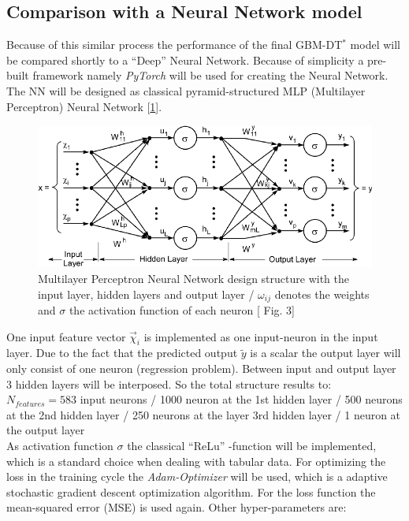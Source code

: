 \documentclass[12pt, a4paper]{article}
\begin{document}
\subsection{Comparison with a Neural Network model}
Because of this similar process the performance of the final GBM-DT$^{\ast}$ model will be compared shortly to a ``Deep'' Neural Network. Because of simplicity a pre-built framework namely \textit{PyTorch} \cite{PytorchNN} will be used for creating the Neural Network. The NN will be designed as classical pyramid-structured MLP (Multilayer Perceptron) Neural Network [\ref{fig: nn_mlp}].
\begin{figure}[!htpb]
    \centering
    \includegraphics[width=1\textwidth,trim={0 0 0 0},clip]{figures/The-structure-of-a-multilayer-perceptron-neural-network.png}
    \caption[Multilayer Perceptron Neural Network design structure]{Multilayer Perceptron Neural Network design structure with the input layer, hidden layers and output layer / $\omega_{ij}$ denotes the weights and $\sigma$ the activation function of each neuron [\cite{Faghfouri2011} Fig. 3]}
    \label{fig: nn_mlp}
\end{figure}
One input feature vector $\vec{\chi}_i$ is implemented as one input-neuron in the input layer. Due to the fact that the predicted output $\tilde{y}$ is a scalar the output layer will only consist of one neuron (regression problem). Between input and output layer 3 hidden layers will be interposed. So the total structure results to: $N_{features} = 583$ input neurons / 1000 neuron at the 1st hidden layer / 500 neurons at the 2nd hidden layer / 250 neurons at the layer 3rd hidden layer / 1 neuron at the output layer \\
As activation function $\sigma$ the classical ``ReLu'' -function will be implemented, which is a standard choice when dealing with tabular data. For optimizing the loss in the training cycle the \textit{Adam-Optimizer} \cite{Pytorch} will be used, which is a adaptive stochastic gradient descent optimization algorithm. For the loss function the mean-squared error (MSE) is used again. Other hyper-parameters are: \\
\end{document}
